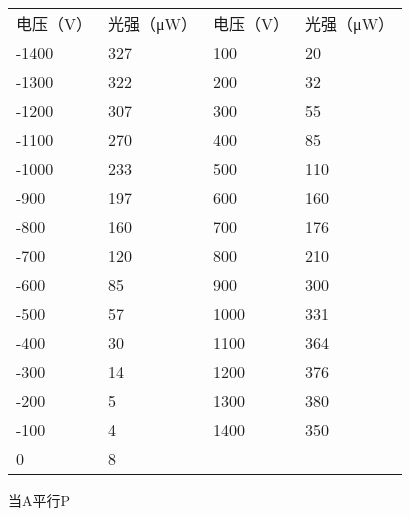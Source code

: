 \documentclass[font=default]{mpltx}
\begin{document}
\begin{table}[]
\begin{tabular}{llll}
电压（V）                      & 光强（μW）                   & 电压（V） & 光强（μW） \\
-1400                      & 327                      & 100   & 20     \\
-1300                      & 322                      & 200   & 32     \\
-1200                      & 307                      & 300   & 55     \\
-1100                      & 270                      & 400   & 85     \\
-1000                      & 233                      & 500   & 110    \\
-900                       & 197                      & 600   & 160    \\ \cline{1-2}
\multicolumn{1}{|l|}{-800} & \multicolumn{1}{l|}{160} & 700   & 176    \\ \cline{1-2}
-700                       & 120                      & 800   & 210    \\
-600                       & 85                       & 900   & 300    \\
-500                       & 57                       & 1000  & 331    \\
-400                       & 30                       & 1100  & 364    \\
-300                       & 14                       & 1200  & 376    \\
-200                       & 5                        & 1300  & 380    \\
-100                       & 4                        & 1400  & 350    \\
0                          & 8                        &       &       
\end{tabular}
\end{table}

当A平行P
\end{document}

